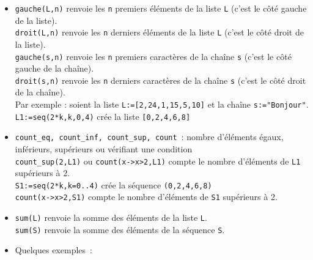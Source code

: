 \documentclass[12pt,a4paper]{book}
\begin{document}
\begin{giacjshere}
\begin{itemize}
{\tt s|0]} d\'esigne le premier caract\`ere de la cha\^{\i}ne et {\tt s[dim(s)-1]} 
d\'esigne le dernier caract\`ere de la cha\^ine {\tt S}.\\
\item
{\tt gauche(L,n)} renvoie les {\tt n} premiers \'el\'ements de la liste {\tt L}
(c'est le c\^ot\'e gauche de la liste).\\
{\tt droit(L,n)} renvoie les {\tt n} derniers \'el\'ements de la liste {\tt L}
(c'est le c\^ot\'e droit de la liste).\\
{\tt gauche(s,n)} renvoie les {\tt n} premiers caract\`eres de la cha\^ine 
{\tt s} (c'est le c\^ot\'e gauche de la cha\^ine).\\
{\tt droit(s,n)} renvoie les {\tt n} derniers caract\`eres de la cha\^ine 
{\tt s} (c'est le c\^ot\'e droit de la cha\^ine).\\
 Par exemple : soient la liste  {\tt L:=[2,24,1,15,5,10]} et la cha\^ine
{\tt s:="Bonjour"}.\\
{\tt L1:=seq(2*k,k,0,4)} cr\'ee la liste {\tt [0,2,4,6,8]}
\item \verb|count_eq, count_inf, count_sup, count|~: nombre d'\'el\'ements
\'egaux, inf\'erieurs, sup\'erieurs ou v\'erifiant une condition\\
\verb|count_sup(2,L1)| ou {\tt count(x->x>2,L1)} compte le nombre d'\'el\'ements de {\tt L1} sup\'erieurs
 \`a 2.\\
{\tt S1:=seq(2*k,k=0..4)} cr\'ee la s\'equence {\tt (0,2,4,6,8)}\\
{\tt count(x->x>2,S1)} compte le nombre d'\'el\'ements de {\tt S1} sup\'erieurs
 \`a 2.
\item
{\tt sum(L)} renvoie la somme des \'el\'ements de la liste {\tt L}.\\
{\tt sum(S)} renvoie la somme des \'el\'ements de la s\'equence {\tt S}.
\item Quelques exemples~:\\
\\
\\
 \\
\\
\\
 \\
 \\
\\

\end{itemize}
\end{giacjshere}
\end{document}
